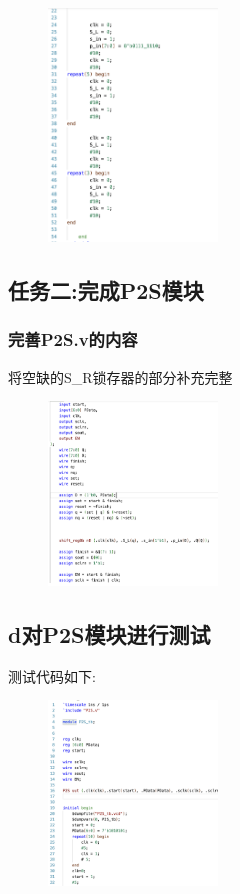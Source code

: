 \documentclass{article}
\begin{document}
    \begin{figure}[H]
        \centering
        \includegraphics[width=0.4\textwidth]{p3.png}
        
        \end{figure}

\subsection*{任务二:完成P2S模块}

\subsubsection*{完善P2S.v的内容}
将空缺的S\_R锁存器的部分补充完整
\begin{figure}[H]
    \centering
    \includegraphics[width=0.4\textwidth]{p4.png}
    
    \end{figure}

\subsection*{d对P2S模块进行测试}
测试代码如下:
\begin{figure}[H]
    \centering
    \includegraphics[width=0.4\textwidth]{p5.png}
    
    \end{figure}
\end{document}
